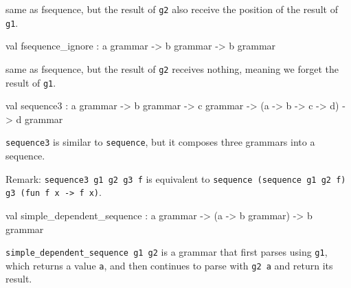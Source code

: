 \documentclass[11pt]{article}
\begin{document}
same as fsequence, but the result of {\tt{g2}} also receive the position of the
    result of {\tt{g1}}.



\label{val:Earley.fsequence-underscoreignore}\begin{ocamldoccode}
val fsequence_ignore : {\textquotesingle}a grammar -> {\textquotesingle}b grammar -> {\textquotesingle}b grammar
\end{ocamldoccode}
\begin{ocamldocdescription}
same as fsequence, but the result of {\tt{g2}} receives nothing, meaning
    we forget the result of {\tt{g1}}.


\end{ocamldocdescription}




\label{val:Earley.sequence3}\begin{ocamldoccode}
val sequence3 :
  {\textquotesingle}a grammar ->
  {\textquotesingle}b grammar ->
  {\textquotesingle}c grammar -> ({\textquotesingle}a -> {\textquotesingle}b -> {\textquotesingle}c -> {\textquotesingle}d) -> {\textquotesingle}d grammar
\end{ocamldoccode}
\begin{ocamldocdescription}
{\tt{sequence3}} is similar to {\tt{sequence}}, but it composes three grammars into
    a sequence.


    Remark: {\tt{sequence3 g1 g2 g3 f}} is equivalent to
    {\tt{sequence (sequence g1 g2 f) g3 (fun f x -> f x)}}.


\end{ocamldocdescription}




\label{val:Earley.simple-underscoredependent-underscoresequence}\begin{ocamldoccode}
val simple_dependent_sequence :
  {\textquotesingle}a grammar -> ({\textquotesingle}a -> {\textquotesingle}b grammar) -> {\textquotesingle}b grammar
\end{ocamldoccode}
\begin{ocamldocdescription}
{\tt{simple\_dependent\_sequence g1 g2}} is a grammar that first parses using {\tt{g1}},
    which returns a value {\tt{a}}, and then continues to parse with {\tt{g2 a}} and
    return its result.


\end{ocamldocdescription}
\end{document}
